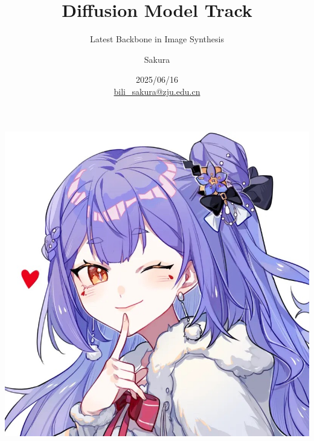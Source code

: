 \documentclass[aspectratio=169]{beamer}
\title[]{Diffusion Model Track}
\subtitle{Latest Backbone in Image Synthesis}
\author[author]{Sakura}
\date{2025/06/16\\\small\href{mailto:bili_sakura@zju.edu.cn}{bili\_sakura@zju.edu.cn}}
\begin{document}
\begin{frame}
  \begin{minipage}{0.68\linewidth}
    \titlepage
  \end{minipage}%
  \hfill
  \begin{minipage}{0.30\linewidth}
    \centering
    \includegraphics[width=0.9\linewidth]{profile_new.jpeg}
  \end{minipage}
\end{frame}


\end{document}
